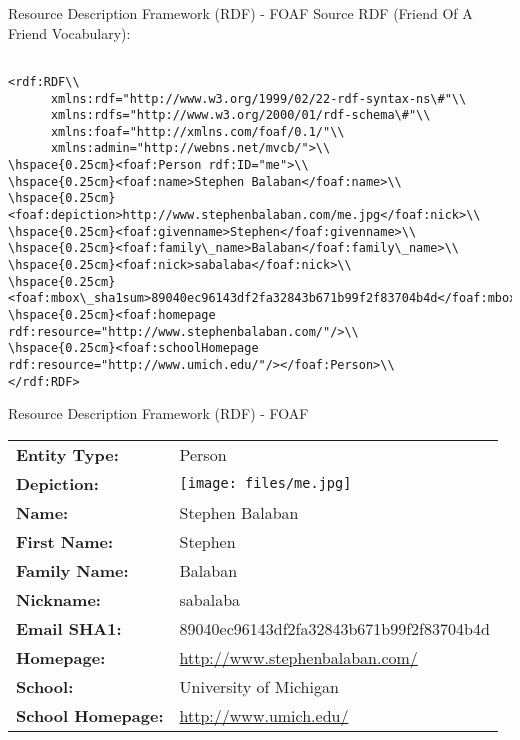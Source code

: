 \documentclass{beamer}
\begin{document}
\begin{frame}{Resource Description Framework (RDF) - FOAF}
Source RDF (Friend Of A Friend Vocabulary):
{\tiny\begin{verbatim}

<rdf:RDF\\
      xmlns:rdf="http://www.w3.org/1999/02/22-rdf-syntax-ns\#"\\
      xmlns:rdfs="http://www.w3.org/2000/01/rdf-schema\#"\\
      xmlns:foaf="http://xmlns.com/foaf/0.1/"\\
      xmlns:admin="http://webns.net/mvcb/">\\
\hspace{0.25cm}<foaf:Person rdf:ID="me">\\
\hspace{0.25cm}<foaf:name>Stephen Balaban</foaf:name>\\
\hspace{0.25cm}<foaf:depiction>http://www.stephenbalaban.com/me.jpg</foaf:nick>\\
\hspace{0.25cm}<foaf:givenname>Stephen</foaf:givenname>\\
\hspace{0.25cm}<foaf:family\_name>Balaban</foaf:family\_name>\\
\hspace{0.25cm}<foaf:nick>sabalaba</foaf:nick>\\
\hspace{0.25cm}<foaf:mbox\_sha1sum>89040ec96143df2fa32843b671b99f2f83704b4d</foaf:mbox\_sha1sum>\\
\hspace{0.25cm}<foaf:homepage rdf:resource="http://www.stephenbalaban.com/"/>\\
\hspace{0.25cm}<foaf:schoolHomepage rdf:resource="http://www.umich.edu/"/></foaf:Person>\\
</rdf:RDF>
\end{verbatim}}
\end{frame}

\begin{frame}{Resource Description Framework (RDF) - FOAF}
\begin{tabular}{ l l }
\textbf{Entity Type:}& Person \\
\textbf{Depiction:}& \texttt{[image: files/me.jpg]}\\
\textbf{Name:}& Stephen Balaban\\
\textbf{First Name:}& Stephen\\
\textbf{Family Name:}& Balaban\\
\textbf{Nickname:}& sabalaba\\
\textbf{Email SHA1:}& 89040ec96143df2fa32843b671b99f2f83704b4d\\
\textbf{Homepage:}& \url{http://www.stephenbalaban.com/}\\
\textbf{School:}& University of Michigan\\
\textbf{School Homepage:}& \url{http://www.umich.edu/}\\
\end{tabular}
\end{frame}
\end{document}
